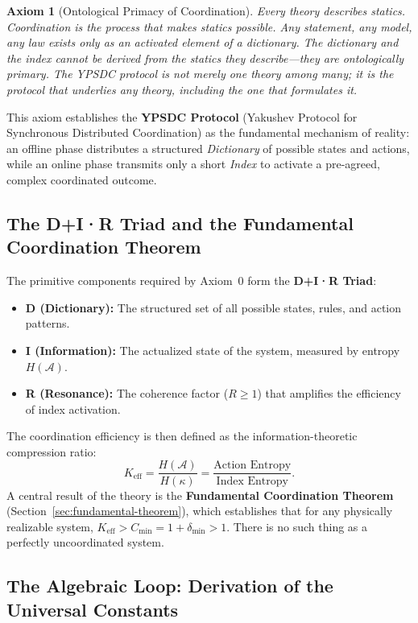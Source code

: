 \documentclass[11pt,a4paper]{article}
\newtheorem{axiom}{Axiom}
\begin{document}
\begin{axiom}[Ontological Primacy of Coordination]
	Every theory describes statics. Coordination is the process that makes statics possible. Any statement, any model, any law exists only as an activated element of a dictionary. The dictionary and the index cannot be derived from the statics they describe---they are ontologically primary. The YPSDC protocol is not merely one theory among many; it is the protocol that underlies any theory, including the one that formulates it.
\end{axiom}

This axiom establishes the \textbf{YPSDC Protocol} (Yakushev Protocol for Synchronous Distributed Coordination) as the fundamental mechanism of reality: an offline phase distributes a structured \textit{Dictionary} of possible states and actions, while an online phase transmits only a short \textit{Index} to activate a pre-agreed, complex coordinated outcome.

\subsection{The D+I·R Triad and the Fundamental Coordination Theorem}
\label{subsec:dir-triad}

The primitive components required by Axiom~0 form the \textbf{D+I·R Triad}:
\begin{itemize}
	\item \textbf{D (Dictionary):} The structured set of all possible states, rules, and action patterns.
	\item \textbf{I (Information):} The actualized state of the system, measured by entropy \(H(\mathcal{A})\).
	\item \textbf{R (Resonance):} The coherence factor (\(R \geq 1\)) that amplifies the efficiency of index activation.
\end{itemize}
The coordination efficiency is then defined as the information-theoretic compression ratio:
\[
K_{\mathrm{eff}} = \frac{H(\mathcal{A})}{H(\kappa)} = \frac{\text{Action Entropy}}{\text{Index Entropy}}.
\]
A central result of the theory is the \textbf{Fundamental Coordination Theorem} (Section~\ref{sec:fundamental-theorem}), which establishes that for any physically realizable system, \(K_{\mathrm{eff}} > C_{\min} = 1 + \delta_{\min} > 1\). There is no such thing as a perfectly uncoordinated system.

\subsection{The Algebraic Loop: Derivation of the Universal Constants}
\label{subsec:algebraic-loop}
\end{document}
